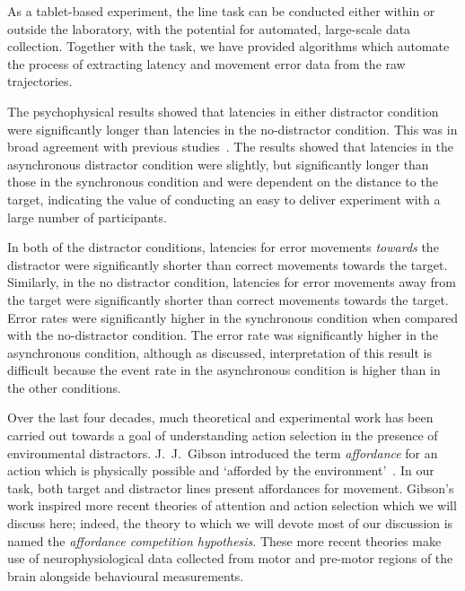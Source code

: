 \documentclass[10pt,letterpaper]{article}
\begin{document}
As a tablet-based experiment, the line task can be conducted either
within or outside the laboratory, with the potential for automated,
large-scale data collection.
%
Together with the task, we have provided algorithms
which automate the process of extracting latency and movement error
data from the raw trajectories.



The psychophysical results showed that latencies in either distractor
condition were significantly longer than latencies in the
no-distractor condition. This was in broad agreement with previous
studies~\cite{tipper_selective_1992,meegan_visual_1999,pratt_action-centered_1994}.
The results showed that latencies in
the asynchronous distractor condition were slightly, but significantly longer than
those in the synchronous condition and were dependent on the distance
to the target, indicating the value of conducting an easy to deliver
experiment with a large number of participants.

In both of the distractor conditions, latencies for error movements
\emph{towards} the distractor were significantly shorter than correct
movements towards the target. Similarly, in the no distractor
condition, latencies for error movements away from the target were
significantly shorter than correct movements towards the target. Error
rates were significantly higher in the synchronous condition when
compared with the no-distractor condition. The error rate was
significantly higher in the asynchronous condition, although as
discussed, interpretation of this result is difficult because the
event rate in the asynchronous condition is higher than in the other
conditions.

Over the last four decades, much theoretical and experimental work has
been carried out towards a goal of understanding action selection in
the presence of environmental distractors. J.~J.~Gibson introduced the
term \emph{affordance} for an action which is physically possible and
`afforded by the environment'~\cite{gibson_ecological_1979}. In our
task, both target and distractor lines present affordances for
movement. Gibson's work inspired more recent theories of attention and
action selection which we will discuss here; indeed, the theory to
which we will devote most of our discussion is named the
\emph{affordance competition hypothesis}. These more recent theories
make use of neurophysiological data collected from motor and pre-motor
regions of the brain alongside behavioural measurements.
\end{document}

